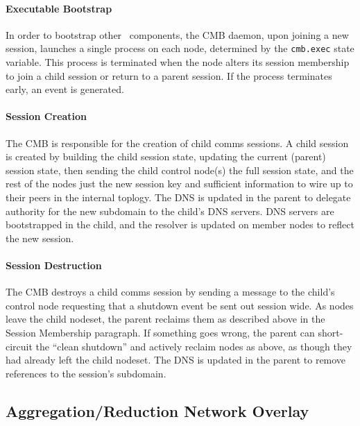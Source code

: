 \paragraph{Executable Bootstrap}
In order to bootstrap other \ngrm\ components, the CMB daemon, upon
joining a new session, launches a single process on each node,
determined by the {\tt cmb.exec} state variable.
This process is terminated when the node alters its session membership
to join a child session or return to a parent session.
If the process terminates early, an event is generated.


\paragraph{Session Creation}
The CMB is responsible for the creation of
child comms sessions.
A child session is created by building the child session state,
updating the current (parent) session state, then sending the
child control node(s) the full session state, and the rest of the nodes
just the new session key and sufficient information to wire up to their
peers in the internal toplogy.
The DNS is updated in the parent to delegate authority
for the new subdomain to the child's DNS servers.
DNS servers are bootstrapped in the child, and the resolver is updated
on member nodes to reflect the new session.

\paragraph{Session Destruction}
The CMB destroys a child comms session by sending a message to the child's
control node requesting that a shutdown event be sent out session wide.
As nodes leave the child nodeset, the parent reclaims them as described 
above in the Session Membership paragraph.
If something goes wrong, the parent can short-circuit the ``clean shutdown''
and actively reclaim nodes as above, as though they had already left the
child nodeset.
The DNS is updated in the parent to remove references to the session's
subdomain.

\subsection{Aggregation/Reduction Network Overlay}

